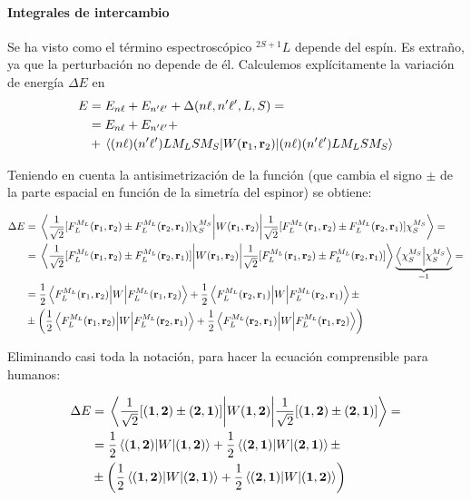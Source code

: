 \paragraph{Integrales de intercambio}
\label{paragraph:intinterc}
Se ha visto como el término espectroscópico ${}^{2S+1}\!L$ depende del
espín. Es extraño, ya que la perturbación no depende de él. Calculemos
explícitamente la variación de energía $\Delta E$ en
\begin{equation}
  \begin{split}
    E &= E_{n\ell} + E_{n'\ell'} + \Delta(n\ell,n'\ell',L,S) = \\
    &= E_{n\ell} + E_{n'\ell'} + \\ &+ \ev{W(\boldrm{r}_1,\boldrm{r}_2)}{(n\ell)(n'\ell')LM_LSM_S}
  \end{split}
\end{equation}

Teniendo en cuenta la antisimetrización de la función (que cambia el signo
$\pm$ de la parte espacial en función de la simetría del espinor) se
obtiene:
\begin{fullwidth}
\begin{equation}
  \begin{split}
    \Delta E &=
    \ev{W(\boldrm{r}_1,\boldrm{r}_2)}{\frac{1}{\sqrt{2}}[F_L^{M_L}(\boldrm{r}_1,\boldrm{r}_2)\pm
      F_L^{M_L}(\boldrm{r}_2,\boldrm{r}_1)]\chi_S^{M_S}} = \\
    &= \ev{W(\boldrm{r}_1,\boldrm{r}_2)}{\frac{1}{\sqrt{2}}[F_L^{M_L}(\boldrm{r}_1,\boldrm{r}_2)\pm
      F_L^{M_L}(\boldrm{r}_2,\boldrm{r}_1)]}
    \underbrace{\ip{\chi_S^{M_S}}}_{=1}= \\
    &= \frac{1}{2} \ev{W}{F_L^{M_L}(\boldrm{r}_1,\boldrm{r}_2)}
    + \frac{1}{2} \ev{W}{F_L^{M_L}(\boldrm{r}_2,\boldrm{r}_1)}
    \pm \\ &\pm \left( 
    \frac{1}{2} \mel{F_L^{M_L}(\boldrm{r}_1,\boldrm{r}_2)}{W}{F_L^{M_L}(\boldrm{r}_2,\boldrm{r}_1)}
    + \frac{1}{2}
    \mel{F_L^{M_L}(\boldrm{r}_2,\boldrm{r}_1)}{W}{F_L^{M_L}(\boldrm{r}_1,\boldrm{r}_2)}  \right)
  \end{split}
\end{equation}
\end{fullwidth}

Eliminando casi toda la notación, para hacer la ecuación comprensible
para humanos:

\begin{equation}
  \begin{split}
    \Delta E &=
    \ev{W(\boldrm{1},\boldrm{2})}{\frac{1}{\sqrt{2}}[(\boldrm{1},\boldrm{2})\pm
      (\boldrm{2},\boldrm{1})]} = \\
    &= \frac{1}{2} \ev{W}{(\boldrm{1},\boldrm{2})}
    + \frac{1}{2} \ev{W}{(\boldrm{2},\boldrm{1})}
    \pm \\ &\pm
    \left( \frac{1}{2} \mel{(\boldrm{1},\boldrm{2})}{W}{(\boldrm{2},\boldrm{1})}
    + \frac{1}{2}
    \mel{(\boldrm{2},\boldrm{1})}{W}{(\boldrm{1},\boldrm{2})} \right)
  \end{split}
\end{equation}

